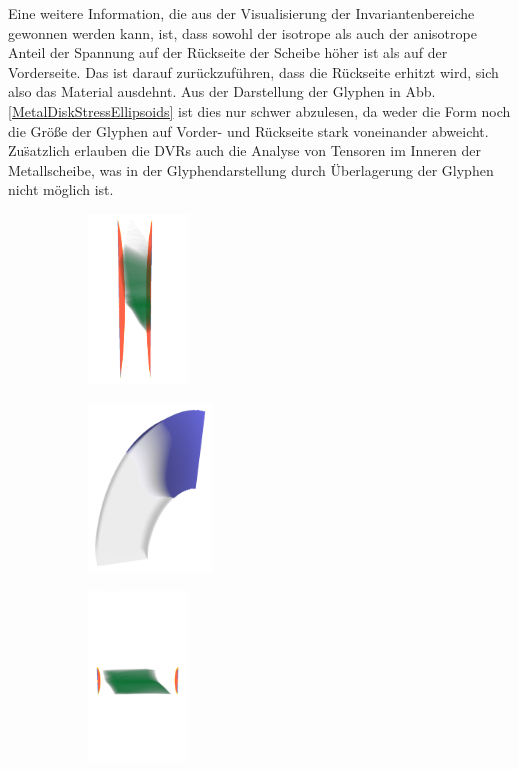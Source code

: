 \documentclass[a4paper,fontsize=12pt,toc=bib,halfparskip]{scrartcl}
\begin{document}
Eine weitere Information, die aus der Visualisierung der Invariantenbereiche gewonnen werden kann, ist, dass sowohl der isotrope als auch der anisotrope Anteil der Spannung auf der R\"uckseite der Scheibe h\"oher ist als auf der Vorderseite. Das ist darauf zur\"uckzuf\"uhren, dass die R\"uckseite erhitzt wird, sich also das Material ausdehnt. Aus der Darstellung der Glyphen in Abb. \ref{MetalDiskStressEllipsoids} ist dies nur schwer abzulesen, da weder die Form noch die Gr\"o{\ss}e der Glyphen auf Vorder- und R\"uckseite stark voneinander abweicht. Zu\"satzlich erlauben die DVRs auch die Analyse von Tensoren im Inneren der Metallscheibe, was in der Glyphendarstellung durch \"Uberlagerung der Glyphen nicht m\"oglich ist.

\clearpage

\begin{figure}
	\begin{subfigure}{0.49\textwidth}
		\centering
		\includegraphics[height=4.5cm]{pictures/results/MetalDiskStress_InvariantSpace1.png}
		\subcaption{}
		\label{MetalDiskStressInvariant1}
	\end{subfigure}
	\hspace*{\fill}
	\begin{subfigure}{0.49\textwidth}
		\centering
		\includegraphics[height=4.5cm]{pictures/results/MetalDiskStress_Object1.png}
		\subcaption{}
		\label{MetalDiskStressObject1}
	\end{subfigure}
	\medskip
	\begin{subfigure}{0.49\textwidth}
		\centering
		\includegraphics[height=4.5cm]{pictures/results/MetalDiskStress_InvariantSpace2.png}

\end{subfigure}
\end{figure}
\end{document}
